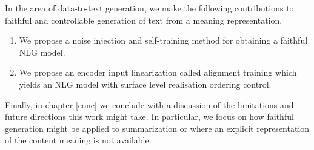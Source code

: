     In the area of data-to-text generation, we make the following 
    contributions to faithful and controllable generation of 
    text from a meaning representation. 
    \begin{enumerate}
        \item We propose a noise injection and self-training method
            for obtaining a faithful NLG model.
        \item We propose an encoder input linearization called alignment
            training which  yields an NLG model with surface level
            realisation ordering control.
    \end{enumerate}


Finally, in chapter \autoref{conc} we conclude with a discussion of the 
limitations and future 
directions this work might take. In particular, we focus on how 
faithful generation might be applied to summarization or \machinetranslation
where an explicit representation of the content meaning is not available. 





